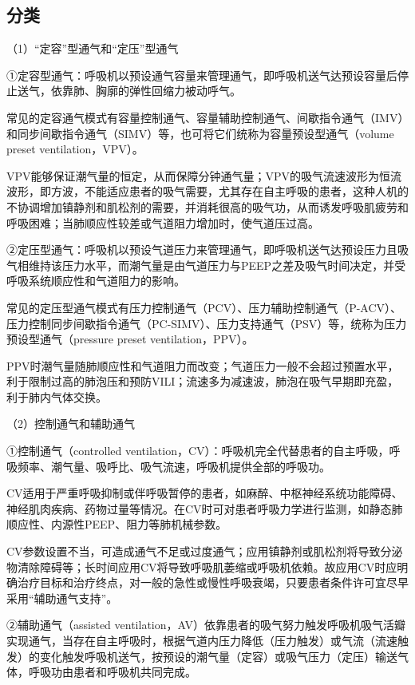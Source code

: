 \subsection{分类}

（1）“定容”型通气和“定压”型通气

①定容型通气：呼吸机以预设通气容量来管理通气，即呼吸机送气达预设容量后停止送气，依靠肺、胸廓的弹性回缩力被动呼气。

常见的定容通气模式有容量控制通气、容量辅助控制通气、间歇指令通气（IMV）和同步间歇指令通气（SIMV）等，也可将它们统称为容量预设型通气（volume
preset ventilation，VPV）。

VPV能够保证潮气量的恒定，从而保障分钟通气量；VPV的吸气流速波形为恒流波形，即方波，不能适应患者的吸气需要，尤其存在自主呼吸的患者，这种人机的不协调增加镇静剂和肌松剂的需要，并消耗很高的吸气功，从而诱发呼吸肌疲劳和呼吸困难；当肺顺应性较差或气道阻力增加时，使气道压过高。

②定压型通气：呼吸机以预设气道压力来管理通气，即呼吸机送气达预设压力且吸气相维持该压力水平，而潮气量是由气道压力与PEEP之差及吸气时间决定，并受呼吸系统顺应性和气道阻力的影响。

常见的定压型通气模式有压力控制通气（PCV）、压力辅助控制通气（P-ACV）、压力控制同步间歇指令通气（PC-SIMV）、压力支持通气（PSV）等，统称为压力预设型通气（pressure
preset ventilation，PPV）。

PPV时潮气量随肺顺应性和气道阻力而改变；气道压力一般不会超过预置水平，利于限制过高的肺泡压和预防VILI；流速多为减速波，肺泡在吸气早期即充盈，利于肺内气体交换。

（2）控制通气和辅助通气

①控制通气（controlled
ventilation，CV）：呼吸机完全代替患者的自主呼吸，呼吸频率、潮气量、吸呼比、吸气流速，呼吸机提供全部的呼吸功。

CV适用于严重呼吸抑制或伴呼吸暂停的患者，如麻醉、中枢神经系统功能障碍、神经肌肉疾病、药物过量等情况。在CV时可对患者呼吸力学进行监测，如静态肺顺应性、内源性PEEP、阻力等肺机械参数。

CV参数设置不当，可造成通气不足或过度通气；应用镇静剂或肌松剂将导致分泌物清除障碍等；长时间应用CV将导致呼吸肌萎缩或呼吸机依赖。故应用CV时应明确治疗目标和治疗终点，对一般的急性或慢性呼吸衰竭，只要患者条件许可宜尽早采用“辅助通气支持”。

②辅助通气（assisted
ventilation，AV）依靠患者的吸气努力触发呼吸机吸气活瓣实现通气，当存在自主呼吸时，根据气道内压力降低（压力触发）或气流（流速触发）的变化触发呼吸机送气，按预设的潮气量（定容）或吸气压力（定压）输送气体，呼吸功由患者和呼吸机共同完成。

